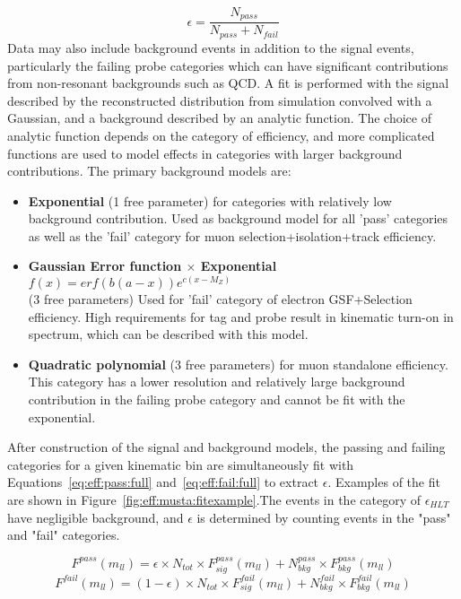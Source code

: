 \begin{equation}
\epsilon = \frac{N_{pass}}{N_{pass}+N_{fail}}
\label{eq:eff:eq}
\end{equation}
Data may also include background events in addition to the \zll signal events, particularly the failing probe categories which can have significant contributions from non-resonant backgrounds such as QCD. A fit is performed with the \zll signal described by the reconstructed \mll distribution from simulation convolved with a Gaussian, and a background described by an analytic function. The choice of analytic function depends on the category of efficiency, and more complicated functions are used to model effects in categories with larger background contributions. The primary background models are:
\begin{itemize}
\item \textbf{Exponential} (1 free parameter) for categories with relatively low background contribution. Used as background model for all 'pass' categories as well as the 'fail' category for muon selection+isolation+track efficiency.
\item \textbf{Gaussian Error function $\times$ Exponential} $f(x)=erf(b(a-x))e^{c(x-M_Z)}$\\ (3 free parameters) Used for 'fail' category of electron GSF+Selection efficiency. High \pt requirements for tag and probe result in kinematic turn-on in \mll spectrum, which can be described with this model.
\item \textbf{Quadratic polynomial} (3 free parameters) for muon standalone efficiency. This category has a lower resolution and relatively large background contribution in the failing probe category and cannot be fit with the exponential.
\end{itemize}
After construction of the signal and background models, the passing and failing categories for a given kinematic bin are simultaneously fit with Equations~\ref{eq:eff:pass:full} and~\ref{eq:eff:fail:full} to extract $\epsilon$. Examples of the fit are shown in Figure~\ref{fig:eff:musta:fitexample}.The events in the category of $\epsilon_{HLT}$ have negligible background, and $\epsilon$ is determined by counting events in the "pass" and "fail" categories.

\begin{equation}
F^{pass}\left(m_{ll}\right)=\epsilon \times N_{tot} \times F_{sig}^{pass}\left(m_{ll} \right) + N^{pass}_{bkg} \times F_{bkg}^{pass} \left(m_{ll} \right)
\label{eq:eff:pass:full}
\end{equation}
\begin{equation}
F^{fail}\left(m_{ll}\right)=\left(1-\epsilon\right) \times N_{tot} \times F_{sig}^{fail}\left(m_{ll} \right) + N^{fail}_{bkg} \times F_{bkg}^{fail} \left(m_{ll} \right)
\label{eq:eff:fail:full}
\end{equation}





